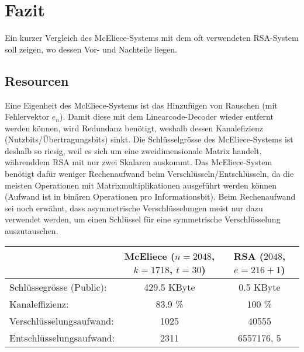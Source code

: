 %
%
%
\section{Fazit
\label{mceliece:section:fazit}}
Ein kurzer Vergleich des McEliece-Systems
mit dem oft verwendeten RSA-System soll zeigen, wo dessen Vor- und Nachteile liegen.

\subsection{Resourcen}
Eine Eigenheit des McEliece-Systems ist das Hinzufügen von Rauschen (mit Fehlervektor $e_n$).
Damit diese mit dem Linearcode-Decoder wieder entfernt werden können,
wird Redundanz benötigt,
weshalb dessen Kanalefizienz (Nutzbits/Übertragungsbits) sinkt.
Die Schlüsselgrösse des McEliece-Systems ist deshalb so riesig, weil es sich um eine zweidimensionale Matrix handelt, währenddem RSA mit nur zwei Skalaren auskommt.
Das McEliece-System benötigt dafür weniger Rechenaufwand beim Verschlüsseln/Entschlüsseln, da die meisten Operationen mit Matrixmultiplikationen ausgeführt werden können (Aufwand ist in binären Operationen pro Informationsbit)\cite{mceliece:CodeBasedCrypto}.
Beim Rechenaufwand sei noch erwähnt,
dass asymmetrische Verschlüsselungen meist nur dazu verwendet werden,
um einen Schlüssel für eine symmetrische Verschlüsselung auszutauschen.
\begin{center}
\begin{tabular}{l|c|c}
                                &McEliece ($n=2048$, $k=1718$, $t = 30$)  &RSA ($2048$, $e = 216 + 1$)\\
    \hline
    Schlüssegrösse (Public):    &429.5 KByte                        &0.5 KByte              \\
    Kanaleffizienz:             &83.9 \%                            &100 \%                 \\
    Verschlüsselungsaufwand:    &1025                               &40555                  \\
    Entschlüsselungsaufwand:    &2311                               &6557176, 5
\end{tabular}
\end{center}

